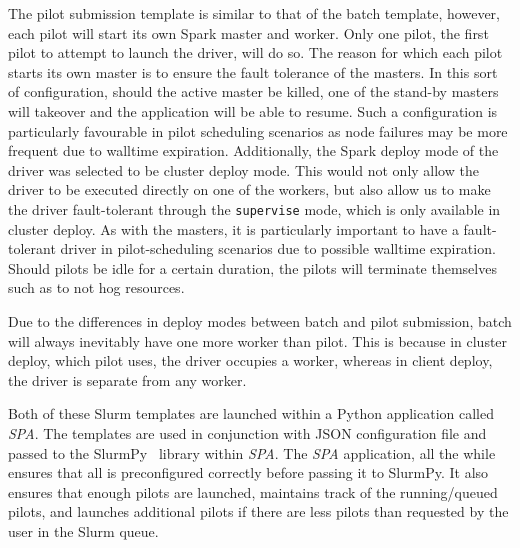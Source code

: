\documentclass{IEEEtran}
\newcommand{\tristan}[1]{\color{red}\textbf{Note from Tristan}:
      #1 \color{black}}
\newcommand{\TG}[1]{\tristan{#1}}
\begin{document}
    The pilot submission template is similar to that of the batch template, however,
    each pilot will start its own Spark master and worker. Only one pilot,
    the first pilot to attempt to launch the driver, will do so. The reason for 
    which each pilot starts its own master is to ensure the fault tolerance of the 
    masters. In this sort of configuration, should the active master be killed, one
    of the stand-by masters will takeover and the application will be able to 
    resume. Such a configuration is particularly favourable in pilot scheduling 
    scenarios as node failures may be more frequent due to walltime expiration.
    Additionally, the Spark deploy mode of the driver was selected to be cluster deploy mode.
    This would not only allow the driver to be executed directly on one of the workers,
    but also allow us to make the driver fault-tolerant through the
    \texttt{supervise} mode, which is only available in cluster deploy. As
    with the masters, it is particularly important to have a fault-tolerant
    driver in pilot-scheduling scenarios due to possible walltime
    expiration.
    Should pilots be idle for a certain duration, the
    pilots will terminate themselves such as to not hog resources.

    Due to the differences in deploy modes between batch and pilot submission, 
    batch will always inevitably have one more worker than pilot. This is because
    in cluster deploy, which pilot uses, the driver occupies a worker, whereas in
    client deploy, the driver is separate from any worker.

    Both of these Slurm templates are launched within a Python application called
    \textit{SPA}. The templates are used in conjunction with JSON configuration 
    file and passed to the SlurmPy~\cite{slurmpy} library within \textit{SPA}.
    The \textit{SPA} application, all the while ensures that all is preconfigured
    correctly before passing it to SlurmPy. It also ensures that enough pilots are
    launched, maintains track of the running/queued pilots, and launches additional
    pilots if there are less pilots than requested by the user in the Slurm queue.
\end{document}
